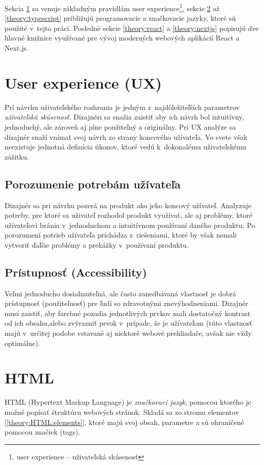 Sekcia \ref{theory:UX} sa venuje základným pravidlám user experience\footnote{user experience -- uživateľská skúsenosť}, sekcie \ref{theory:HTML} až \ref{theory:typescript} približujú programovacie a značkovacie jazyky, ktoré sú použité v~tejto práci. Posledné sekcie \ref{theory:react} a \ref{theory:nextjs} popisujú dve hlavné knižnice využívané pre vývoj moderných webových aplikácií React a Next.js.

\section{User experience (UX)}
\label{theory:UX}
Prí návrhu uživateľského rozhrania je jedným z~najdôležiteľších parametrov \emph{uživateľská skúsenosť}. Dizajnéri sa snažia zaistiť aby ich návrh bol intuitívny, jednoduchý, ale zároveň aj plne použiteľný a originálny. Pri UX analýze sa dizajnér snaží vnímať svoj návrh zo strany koncového užívateľa. Vo svete však neexistuje jednotná definícia úkonov, ktoré vedú k~dokonalému uživateľskému zážitku.

\subsection{Porozumenie potrebám užívateľa}
Dizajnér sa pri návrhu pozerá na produkt ako jeho koncový užívateľ. Analyzuje potreby, pre ktoré sa uživateľ rozhodol produkt využívať, ale aj problémy, ktoré užívateľovi bránia v~jednoduchom a intuitívnom používaní daného produktu. Po porozumení potrieb užívateľa príchádza z~riešeniami, ktoré by však nemali vytvoriť ďaľšie problémy a prekážky v~používaní produktu.

\subsection{Prístupnosť (Accessibility)}
Veľmi jednoducho dosiahnuteľná, ale často zanedbávaná vlastnosť je dobrá prístupnosť (použiteľnosť) pre ľudí so zdravotnými znevýhodneniami. Dizajnér musí zaistiť, aby farebné pozadia jednotlivých prvkov mali dostatočný kontrast od ich obsahu,alebo zvýrazniť prvok v~prípade, že je užívateľom (túto vlastnosť majú v~určitej podobe vstavané aj niektoré webové prehliadače, avšak nie vždy optimálne).

\section{HTML}
\label{theory:HTML}
HTML (Hypertext Markup Language) je \emph{značkovací jazyk}, pomocou ktorého je možné popísať štruktúru webových stránok. Skladá sa zo stromu elementov [\ref{theory:HTML:elements}], ktoré majú svoj obsah, parametre a sú ohraničené pomocou značiek (tags).

